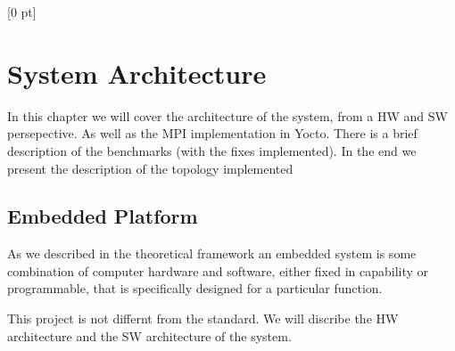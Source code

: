 \titlespacing{\chapter}{0 pt}{30 pt}{50 pt}[0 pt]
\titleformat{\section}{\Large\bfseries}{\thesection}{0 pt}{\hspace{30 pt}}
\titleformat{\subsection}{\large\bfseries}{\thesubsection}{0 pt}{\hspace{30 pt}}
\pagestyle{fancy}
\fancyhead[LO,LE]{\footnotesize\emph{\leftmark}}
\fancyhead[RO,RE]{\thepage}
\fancyfoot[CO,CE]{}

\chapter{System Architecture}

\normalsize
\noindent
In this chapter we will cover the architecture of the system, from a HW and SW
persepective. As well as the MPI implementation in Yocto. There is a brief
description of the benchmarks (with the fixes implemented). In the end we
present the description of the topology implemented

\section{Embedded Platform}
\noindent

As we described in the theoretical framework an embedded system is some
combination of computer hardware and software, either fixed in capability or
programmable, that is specifically designed for a particular function.

This project is not differnt from the standard. We will discribe the HW
architecture and the SW architecture of the system.

